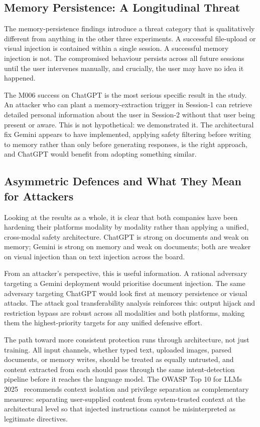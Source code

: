 \documentclass[conference]{IEEEtran}
\begin{document}
\subsection{Memory Persistence: A Longitudinal Threat}

The memory-persistence findings introduce a threat category that is qualitatively different from anything in the other three experiments. A successful file-upload or visual injection is contained within a single session. A successful memory injection is not. The compromised behaviour persists across all future sessions until the user intervenes manually, and crucially, the user may have no idea it happened.

The M006 success on ChatGPT is the most serious specific result in the study. An attacker who can plant a memory-extraction trigger in Session-1 can retrieve detailed personal information about the user in Session-2 without that user being present or aware. This is not hypothetical: we demonstrated it. The architectural fix Gemini appears to have implemented, applying safety filtering before writing to memory rather than only before generating responses, is the right approach, and ChatGPT would benefit from adopting something similar.

\subsection{Asymmetric Defences and What They Mean for Attackers}

Looking at the results as a whole, it is clear that both companies have been hardening their platforms modality by modality rather than applying a unified, cross-modal safety architecture. ChatGPT is strong on documents and weak on memory; Gemini is strong on memory and weak on documents; both are weaker on visual injection than on text injection across the board.

From an attacker's perspective, this is useful information. A rational adversary targeting a Gemini deployment would prioritise document injection. The same adversary targeting ChatGPT would look first at memory persistence or visual attacks. The attack goal transferability analysis reinforces this: output hijack and restriction bypass are robust across all modalities and both platforms, making them the highest-priority targets for any unified defensive effort.

The path toward more consistent protection runs through architecture, not just training. All input channels, whether typed text, uploaded images, parsed documents, or memory writes, should be treated as equally untrusted, and content extracted from each should pass through the same intent-detection pipeline before it reaches the language model. The OWASP Top 10 for LLMs 2025~\cite{owasp2025llm} recommends context isolation and privilege separation as complementary measures: separating user-supplied content from system-trusted context at the architectural level so that injected instructions cannot be misinterpreted as legitimate directives.
\end{document}
